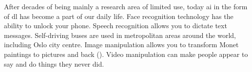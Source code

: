 



After decades of being mainly a research area of limited use, today \acrfull{ai} in the form of \acrfull{dl} has become a part of our daily life. Face recognition technology has the ability to unlock your phone. Speech recognition allows you to dictate text messages. Self-driving buses are used in metropolitan areas around the world, including Oslo city centre. Image manipulation allows you to transform Monet paintings to pictures and back (\cite{zhu2017_cycleGAN_monet_zebra}). Video manipulation can make people appear to say and do things they never did. 

